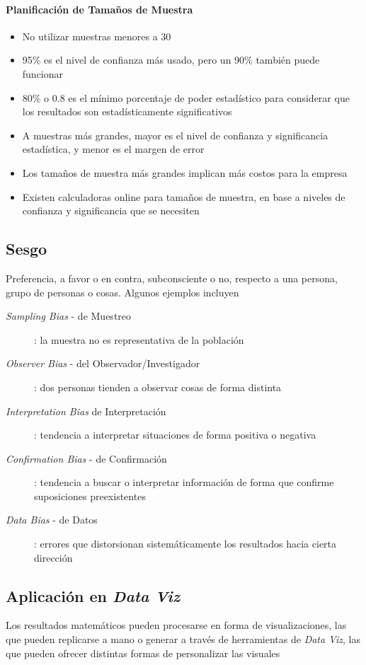 \paragraph{Planificación de Tamaños de Muestra}
\begin{itemize}
    \item {No utilizar muestras menores a 30}
    \item {95\% es el nivel de confianza más usado, pero un 90\% también puede funcionar}
    \item {80\% o 0.8 es el mínimo porcentaje de poder estadístico para considerar que los resultados son estadísticamente significativos}
    \item {A muestras más grandes, mayor es el nivel de confianza y significancia estadística, y menor es el margen de error}
    \item {Los tamaños de muestra más grandes implican más costos para la empresa}
    \item {Existen calculadoras online para tamaños de muestra, en base a niveles de confianza y significancia que se necesiten}
\end{itemize}

\subsection{Sesgo}
Preferencia, a favor o en contra, subconsciente o no, respecto a una persona, grupo de personas o cosas. Algunos ejemplos incluyen 
    \begin{description}
        \item [\textit{Sampling Bias} - de Muestreo]{:  la muestra no es representativa de la población}
        \item [\textit{Observer Bias} - del Observador/Investigador]{: dos personas tienden a observar cosas de forma distinta}
        \item [\textit{Interpretation Bias} de Interpretación]{: tendencia a interpretar situaciones de forma positiva o negativa}
        \item [\textit{Confirmation Bias} - de Confirmación]{: tendencia a buscar o interpretar información de forma que confirme suposiciones preexistentes}
        \item [\textit{Data Bias} - de Datos]{: errores que distorsionan sistemáticamente los resultados hacia cierta dirección}
    \end{description}

\subsection{Aplicación en \textit{Data Viz}}
Los resultados matemáticos pueden procesarse en forma de visualizaciones, las que pueden replicarse a mano o generar a través de herramientas de \textit{Data Viz}, las que pueden ofrecer distintas formas de personalizar las visuales
